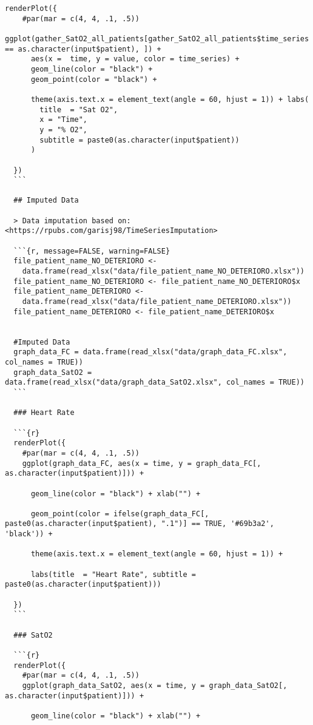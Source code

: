 \begin{lstlisting}[style=mystyle2,caption={Código Visualización de los Datos}, label={lst:codigo-visualizacion}]
  renderPlot({
    #par(mar = c(4, 4, .1, .5))
    ggplot(gather_SatO2_all_patients[gather_SatO2_all_patients$time_series == as.character(input$patient), ]) +
      aes(x =  time, y = value, color = time_series) +
      geom_line(color = "black") +
      geom_point(color = "black") +
      
      theme(axis.text.x = element_text(angle = 60, hjust = 1)) + labs(
        title  = "Sat O2",
        x = "Time",
        y = "% O2",
        subtitle = paste0(as.character(input$patient))
      )
    
  })
  ```
  
  ## Imputed Data
  
  > Data imputation based on: <https://rpubs.com/garisj98/TimeSeriesImputation>
  
  ```{r, message=FALSE, warning=FALSE}
  file_patient_name_NO_DETERIORO <-
    data.frame(read_xlsx("data/file_patient_name_NO_DETERIORO.xlsx"))
  file_patient_name_NO_DETERIORO <- file_patient_name_NO_DETERIORO$x
  file_patient_name_DETERIORO <-
    data.frame(read_xlsx("data/file_patient_name_DETERIORO.xlsx"))
  file_patient_name_DETERIORO <- file_patient_name_DETERIORO$x
  
  
  #Imputed Data
  graph_data_FC = data.frame(read_xlsx("data/graph_data_FC.xlsx", col_names = TRUE))
  graph_data_SatO2 = data.frame(read_xlsx("data/graph_data_SatO2.xlsx", col_names = TRUE))
  ```
  
  ### Heart Rate
  
  ```{r}
  renderPlot({
    #par(mar = c(4, 4, .1, .5))
    ggplot(graph_data_FC, aes(x = time, y = graph_data_FC[, as.character(input$patient)])) +
      
      geom_line(color = "black") + xlab("") +
      
      geom_point(color = ifelse(graph_data_FC[, paste0(as.character(input$patient), ".1")] == TRUE, '#69b3a2', 'black')) +
      
      theme(axis.text.x = element_text(angle = 60, hjust = 1)) +
      
      labs(title  = "Heart Rate", subtitle = paste0(as.character(input$patient)))
    
  })
  ```
  
  ### SatO2
  
  ```{r}
  renderPlot({
    #par(mar = c(4, 4, .1, .5))
    ggplot(graph_data_SatO2, aes(x = time, y = graph_data_SatO2[, as.character(input$patient)])) +
      
      geom_line(color = "black") + xlab("") +
      

\end{lstlisting}
